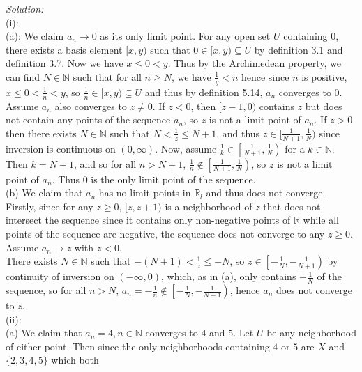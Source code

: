 \documentclass[a4paper]{article}
\begin{document}
   \textit{Solution:}\\
   (i):\\
   (a): We claim $a_n \to 0$ as its only limit point. For any open set
   $U$ containing $0$, there exists a basis element $[x,y)$ such that $0\in [x,y)
   \subseteq U$ by definition 3.1 and definition 3.7. Now we have $x\le 0<y$.
   Thus by the Archimedean property, we can find $N \in
   \mathbb{N}$ such that for all $n\ge N$, we have
   $\frac{1}{y} < n$ hence since $n$ is positive, $x\le 0 < \frac{1}{n}<y$, so
   $\frac{1}{n} \in [x,y) \subseteq U$ and thus by definition 5.14,
   $a_n$ converges to $0$. Assume $a_n$ also converges to $z \neq 0$. If $z < 0$, then
   $[z-1, 0)$ contains $z$ but does not contain any points of the sequence
   $a_n$, so $z$ is not a limit point of $a_n$. If $z>0$ then
   there exists $N \in \mathbb{N}$ such that
   $N < \frac{1}{z} \le N+1$, and thus $z \in [\frac{1}{N+1},\frac{1}{N})$
   since
   inversion is continuous on $(0,\infty)$.
   Now, assume $\frac{1}{k} \in \left[ \frac{1}{N+1},\frac{1}{N} \right) $ for
   a $k \in \mathbb{N}$. Then $k=N+1$, and so for all $n>N+1$, 
   $\frac{1}{n} \not\in \left[ \frac{1}{N+1},\frac{1}{N} \right)$, so $z$ is
   not a limit point of $a_n$. Thus $0$ is the only limit point of the
   sequence.\\
   \linebreak
   (b) We claim that $a_n$ has no limit points in $\mathbb{R}_{l}$ and thus
   does not converge.\\
   Firstly, since for any $z\ge 0$, $[z,z+1)$ is a neighborhood of $z$ that does not intersect the
   sequence since it contains only non-negative points of $\mathbb{R}$ while all
   points of the sequence are negative, the 
   sequence does not converge to any $z\ge 0$.
   Assume $a_n \to z$ with $z<0$.\\
   There exists $N \in \mathbb{N}$ such
   that $-(N+1) < \frac{1}{z} \le  -N$, so $z \in \left[- \frac{1}{N},
   -\frac{1}{N+1}  \right) $ by continuity of inversion on $(-\infty, 0)$, which, as in (a), only contains $-\frac{1}{N}$ 
   of the sequence, so for all $n>N$, $a_n = -\frac{1}{n} \not\in \left[
       -\frac{1}{N}, -\frac{1}{N+1}\right)$, hence $a_n$ does not converge to
       $z$.\\
       \linebreak
       (ii):\\
       (a) We claim that $a_n = 4, n \in \mathbb{N}$ converges to $4$ and $5$.
       Let $U$ be any neighborhood of either point. Then since the only
       neighborhoods containing $4$ or $5$ are $X$ and $\{2,3,4,5\}$ which both
\end{document}
